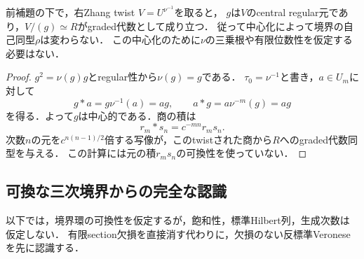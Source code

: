 \documentclass[11pt,a4paper]{ltjsarticle}
\begin{document}
\begin{corollary}[THCRを保つ中心化]
\label{cor:v8-thcr-centralization}\label{cor:v7-centralization}
前補題の下で，右Zhang twist $V=U^{\nu^{-1}}$を取ると，
$g$は$V$のcentral regular元であり，$V/(g)\simeq R$がgraded代数として成り立つ．
従って中心化によって境界の自己同型$\rho$は変わらない．
この中心化のために$\nu$の三乗根や有限位数性を仮定する必要はない．
\end{corollary}

\begin{proof}
$g^2=\nu(g)g$とregular性から$\nu(g)=g$である．
$\tau_0=\nu^{-1}$と書き，$a\in U_m$に対して
\[
 g*a=g\nu^{-1}(a)=ag,
 \qquad a*g=a\nu^{-m}(g)=ag
\]
を得る．よって$g$は中心的である．商の積は
\[
 r_m*s_n=c^{-mn}r_ms_n.
\]
次数$n$の元を$c^{n(n-1)/2}$倍する写像が，このtwistされた商から$R$へのgraded代数同型を与える．
この計算には元の積$r_ms_n$の可換性を使っていない．
\end{proof}

\subsection{可換な三次境界からの完全な認識}\label{subsec:v7-full-recognition}

以下では，境界環の可換性を仮定するが，飽和性，標準Hilbert列，生成次数は仮定しない．
有限section欠損を直接消す代わりに，欠損のない反標準Veroneseを先に認識する．
\end{document}

